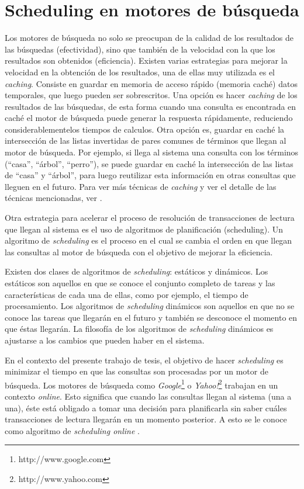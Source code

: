 \section{Scheduling en motores de búsqueda}
\label{marco:scheduling}
Los motores de búsqueda no solo se preocupan de la calidad de los resultados de las búsquedas (efectividad), sino que también de la velocidad con la que los resultados son obtenidos (eficiencia). Existen varias estrategias para mejorar la velocidad en la obtención de los resultados, una de ellas muy utilizada es el \textit{caching}. Consiste en guardar en memoria de acceso rápido (memoria caché) datos temporales, que luego pueden ser sobrescritos. Una opción es hacer \textit{caching} de los resultados de las búsquedas, de esta forma cuando una consulta es encontrada en caché el motor de búsqueda puede generar la respuesta rápidamente, reduciendo considerablementelos tiempos de calculos. Otra opción es, guardar en caché la intersección de las listas invertidas de pares comunes de términos que llegan al motor de búsqueda. Por ejemplo, si llega al sistema una consulta con los términos (``casa'', ``árbol'', ``perro''), se puede guardar en caché la intersección de las listas de ``casa'' y ``árbol'', para luego reutilizar esta información en otras consultas que lleguen en el futuro. Para ver más técnicas de \textit{caching} y ver el detalle de las técnicas mencionadas, ver \citep{Buttcher:2010}. 

Otra estrategia para acelerar el proceso de resolución de transacciones de lectura que llegan al sistema es el uso de algoritmos de planificación (scheduling). Un algoritmo de \textit{scheduling} es el proceso en el cual se cambia el orden en que llegan las consultas al motor de búsqueda con el objetivo de mejorar la eficiencia. 

Existen dos clases de algoritmos de \textit{scheduling}: estáticos y dinámicos. Los estáticos son aquellos en que se conoce el conjunto completo de tareas y las características de cada una de ellas, como por ejemplo, el tiempo de procesamiento. Los algoritmos de \textit{scheduling} dinámicos son aquellos en que no se conoce las tareas que llegarán en el futuro y también se desconoce el momento en que éstas llegarán. La filosofía de los algoritmos de \textit{scheduling} dinámicos es ajustarse a los cambios que pueden haber en el sistema.

En el contexto del presente trabajo de tesis, el objetivo de hacer \textit{scheduling} es minimizar el tiempo en que las consultas son procesadas por un motor de búsqueda. Los motores de búsqueda como \textit{Google}\footnote{http://www.google.com} o \textit{Yahoo!}\footnote{http://www.yahoo.com} trabajan en un contexto \textit{online}. Esto significa que cuando las consultas llegan al sistema (una a una), éste está obligado a tomar una decisión para planificarla sin saber cuáles transacciones de lectura llegarán en un momento posterior. A esto se le conoce como algoritmo de \textit{scheduling online} \citep{Albers:2003, Borodin:1998}.

